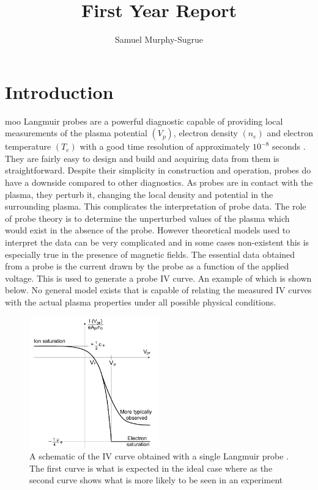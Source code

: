 \documentclass[12pt]{article}
\begin{document}


\title{First Year Report}
\author{Samuel Murphy-Sugrue\\}

\maketitle
\clearpage
\tableofcontents
\clearpage


\section{Introduction}
moo Langmuir probes are a powerful diagnostic capable of providing local measurements of the plasma potential $(V_{p})$, electron density $(n_e)$ and electron temperature $(T_e)$ with a good time resolution of approximately $10^{-8}$ seconds \cite{probetheoryandpractise}. They are fairly easy to design and build and acquiring data from them is straightforward. Despite their simplicity in construction and operation, probes do have a downside compared to other diagnostics. As probes are in contact with the plasma, they perturb it, changing the local density and potential in the surrounding plasma. This complicates the interpretation of probe data. The role of probe theory is to determine the unperturbed values of the plasma which would exist in the absence of the probe. However theoretical models used to interpret the data can be very complicated and in some cases non-existent this is especially true in the presence of magnetic fields. The essential data obtained from a probe is the current drawn by the probe as a function of the applied voltage. This is used to generate a probe IV curve. An example of which is shown below. No general model exists that is capable of relating the measured IV curves with the actual plasma properties under all possible physical conditions.
\begin{figure}[H]
\centering
\includegraphics[width=0.5\textwidth]{monkiv}
\caption{A schematic of the IV curve obtained with a single Langmuir probe \cite{monk}. The first curve is what is expected in the ideal case where as the second curve shows what is more likely to be seen in an experiment}
\label{circuit}
\end{figure}
\end{document}
